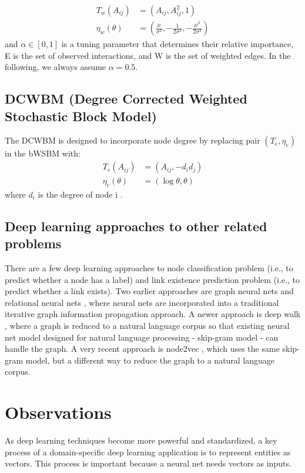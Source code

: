 \documentclass[conference]{IEEEtran}
\begin{document}
\begin{align*}
T_w(A_{ij}) &= (A_{ij}, A_{ij}^2, 1)\\
\eta_w(\theta)
&= (\frac{\mu}{\sigma^2}, -\frac{1}{2\sigma^2}, -\frac{\mu^2}{2\sigma^2})
\end{align*}
and $ \alpha \in [0, 1]$ is a tuning parameter that determines their relative importance,
E is the set of observed interactions,
and W is the set of weighted edges.
In the following, we always assume $ \alpha = 0.5 $.

\subsection{DCWBM (Degree Corrected Weighted Stochastic Block Model)}
The DCWBM is designed to incorporate node degree
by replacing pair $ (T_e, \eta_e) $ in the bWSBM with:
\begin{align*}
	T_e(A_{ij}) &= (A_{ij}, -d_id_j)\\
	\eta_e(\theta) &= (\log\theta, \theta)
\end{align*}
where $ d_i $ is the degree of node i \cite{aicher2014learning}.

\subsection{Deep learning approaches to other related problems}
There are a few deep learning approaches to
node classification problem (i.e., to predict whether a node has a label) and 
link existence prediction problem (i.e., to predict whether a link exists).
Two earlier approaches are graph neural nets and relational neural 
nets \cite{scarselli2009graph}, 
where neural nets are incorporated into a traditional iterative graph 
information propagation approach.
A newer approach is deep walk \cite{perozzi2014deepwalk}, 
where a graph is reduced to a natural language corpus so that existing neural 
net model designed for natural language processing - skip-gram model - can handle the graph.
A very recent approach is node2vec \cite{grovernode2vec},
which uses the same skip-gram model, 
but a different way to reduce the graph to a natural language corpus.

\section{Observations}
As deep learning techniques become more powerful and standardized,
a key process of a domain-specific deep learning application
is to represent entities as vectors.
This process is important because a neural net needs vectors as inputs.
\end{document}
